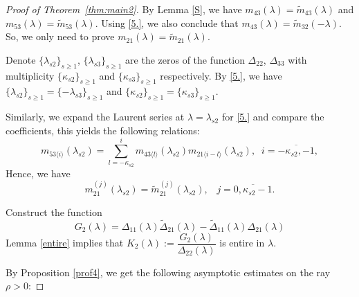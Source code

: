 \documentclass[reqno,12pt,centertags]{amsart}
\numberwithin{equation}{section}
\theoremstyle{definition}
\begin{document}
\begin{proof}[Proof of Theorem~\ref{thm:main2}]
	By Lemma \ref{S}, we have $m_{43}(\lambda)=\tilde{m}_{43}(\lambda)$ and $m_{53}(\lambda)=\tilde{m}_{53}(\lambda)$. Using \eqref{5.}, we also conclude that $m_{43}(\lambda)=\tilde{m}_{32}(-\lambda)$. So, we only need to prove $m_{21}(\lambda)=\tilde{m}_{21}(\lambda)$.
	
	Denote $\{\lambda_{s2}\}_{s\geq1}$, $\{\lambda_{s3}\}_{s\geq1}$ are the zeros of the function $\Delta_{22}$, $\Delta_{33}$ with multiplicity $\{{\kappa_{s2}}\}_{s\geq1}$ and $\{{\kappa_{s3}}\}_{s\geq1}$ respectively. By \eqref{5.}, we have  $\{\lambda_{s2}\}_{s\geq1}=\{-\lambda_{s3}\}_{s\geq1}$ and  $\{{\kappa_{s2}}\}_{s\geq1}=\{{\kappa_{s3}}\}_{s\geq1}$.
	
	Similarly, we expand the Laurent series at $\lambda=\lambda_{s2}$ for \eqref{5.} and compare the coefficients, this yields the following relations:
	\begin{equation*}
		m_{53\langle i\rangle}(\lambda_{s2})=\sum_{l=-\kappa_{s2}}^{i}m_{43\langle l\rangle}(\lambda_{s2})m_{21\langle i-l\rangle}(\lambda_{s2}),\;\;i=\overline{-\kappa_{s2},-1},
	\end{equation*}
Hence, we have 
\begin{equation*}\label{equal11}
		m_{21}^{(j)}(\lambda_{s2})=\tilde{ m}_{21}^{(j)}(\lambda_{s2}),\;\;\;j=\overline{0, \kappa_{s2}-1}.
\end{equation*}

	Construct the function
	$$G_{2}(\lambda)={\Delta}_{11}(\lambda)\tilde{\Delta}_{21}(\lambda)-\tilde{\Delta}_{11}(\lambda){\Delta}_{21}(\lambda)$$
	Lemma \ref{entire} implies that $K_{2}(\lambda):=\dfrac{G_{2}(\lambda)}{\Delta_{22}(\lambda)}$ is entire in $\lambda$.
	
	By Proposition \ref{prof4}, we get the following asymptotic estimates on the ray $\rho > 0$:


\end{proof}
\end{document}
